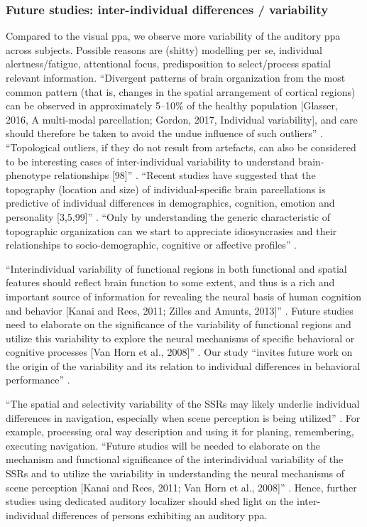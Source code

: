 \subsubsection{Future studies: inter-individual differences / variability}
%
Compared to the visual \ac{ppa}, we observe more variability of the auditory
\ac{ppa} across subjects.
%
Possible reasons are (shitty) modelling per se, individual alertness/fatigue,
attentional focus, predisposition to select/process spatial relevant
information.
%
``Divergent patterns of brain organization from the most common pattern (that
is, changes in the spatial arrangement of cortical regions) can be observed in
approximately 5–10\% of the healthy population [Glasser, 2016, A multi-modal
parcellation; Gordon, 2017, Individual variability], and care should
therefore be taken to avoid the undue influence of such outliers''
\citep{eickhoff2018imaging}.
%
``Topological outliers, if they do not result from artefacts, can also be
considered to be interesting cases of inter-individual variability to understand
brain-phenotype relationships [98]'' \citep{eickhoff2018imaging}.
%
``Recent studies have suggested that the topography (location and size)
of individual-specific brain parcellations is predictive of individual
differences in demographics, cognition, emotion and personality [3,5,99]''
\citep{eickhoff2018imaging}.
%
``Only by understanding the generic characteristic of topographic organization
can we start to appreciate idiosyncrasies and their relationships to
socio-demographic, cognitive or affective profiles''
\citep{eickhoff2018imaging}.

%
``Interindividual variability of functional regions in both functional and
spatial features should reflect brain function to some extent, and thus is a
rich and important source of information for revealing the neural basis of human
cognition and behavior [Kanai and Rees, 2011; Zilles and Amunts, 2013]''
\citep{zhen2015quantifying}.
%
Future studies need to elaborate on the significance of the variability of
functional regions and utilize this variability to explore the neural mechanisms
of specific behavioral or cognitive processes [Van Horn et al., 2008]''
\citep{zhen2015quantifying}.
%
Our study ``invites future work on the origin of the variability and its
relation to individual differences in behavioral performance''
\citep{zhen2015quantifying}.

``The spatial and selectivity variability of the SSRs may likely underlie
individual differences in navigation, especially when scene perception is being
utilized'' \citep{zhen2017quantifying}.
%
For example, processing oral way description and using it for planing,
remembering, executing navigation.
%
``Future studies will be needed to elaborate on the mechanism and functional
significance of the interindividual variability of the SSRs and to utilize the
variability in understanding the neural mechanisms of scene perception [Kanai
and Rees, 2011; Van Horn et al., 2008]'' \citep{zhen2017quantifying}.
%
Hence, further studies using dedicated auditory localizer should shed light on
the inter-individual differences of persons exhibiting an auditory \ac{ppa}.


